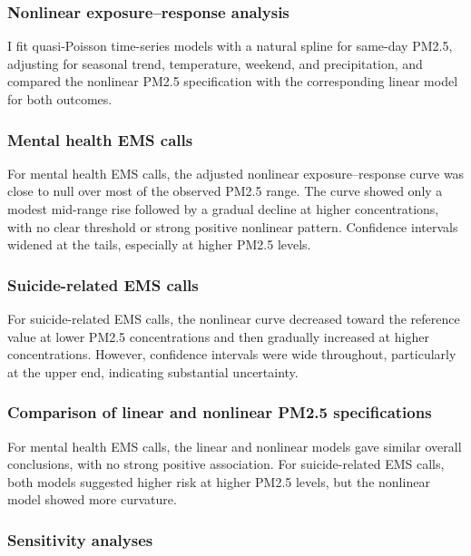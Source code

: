 \documentclass[
]{article}
\begin{document}
\subsubsection{Nonlinear exposure--response
analysis}\label{nonlinear-exposureresponse-analysis}

I fit quasi-Poisson time-series models with a natural spline for
same-day PM2.5, adjusting for seasonal trend, temperature, weekend, and
precipitation, and compared the nonlinear PM2.5 specification with the
corresponding linear model for both outcomes.

\subsubsection{Mental health EMS calls}\label{mental-health-ems-calls}

For mental health EMS calls, the adjusted nonlinear exposure--response
curve was close to null over most of the observed PM2.5 range. The curve
showed only a modest mid-range rise followed by a gradual decline at
higher concentrations, with no clear threshold or strong positive
nonlinear pattern. Confidence intervals widened at the tails, especially
at higher PM2.5 levels.

\subsubsection{Suicide-related EMS
calls}\label{suicide-related-ems-calls}

For suicide-related EMS calls, the nonlinear curve decreased toward the
reference value at lower PM2.5 concentrations and then gradually
increased at higher concentrations. However, confidence intervals were
wide throughout, particularly at the upper end, indicating substantial
uncertainty.

\subsubsection{Comparison of linear and nonlinear PM2.5
specifications}\label{comparison-of-linear-and-nonlinear-pm2.5-specifications}

For mental health EMS calls, the linear and nonlinear models gave
similar overall conclusions, with no strong positive association. For
suicide-related EMS calls, both models suggested higher risk at higher
PM2.5 levels, but the nonlinear model showed more curvature.

\subsubsection{Sensitivity analyses}\label{sensitivity-analyses}
\end{document}
